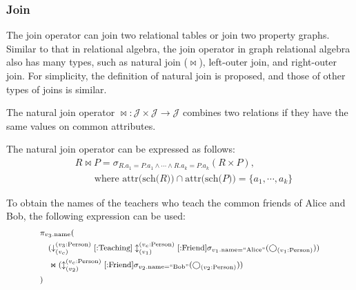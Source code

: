 \subsubsection{Join}

The join operator can join two relational tables or join two property graphs.
Similar to that in relational algebra, the join operator in graph relational algebra also has many types, such as natural join ($\Join$), left-outer join, and right-outer join.
For simplicity, the definition of natural join is proposed, and those of other types of joins is similar.

\begin{definition}
    The natural join operator $\Join : \mathcal{J} \times \mathcal{J} \rightarrow \mathcal{J}$ combines two relations if they have the same values on common attributes.
\end{definition}

The natural join operator can be expressed as follows:
\begin{equation*}
    \begin{split}
        & R \Join P = \sigma_{R.a_1 = P.a_1 \land \cdots \land R.a_k = P.a_k}(R \times P), \\
        & \hspace{2em} \text{where } \text{attr(sch($R$))} \cap \text{attr(sch($P$))} = \{a_1, \cdots, a_k\}
    \end{split}
\end{equation*}

\begin{example}
    To obtain the names of the teachers who teach the common friends of Alice and Bob, the following expression can be used:
    \begin{equation*}
        \footnotesize
        \begin{split}
            & \pi_{v_3\text{.name}}( \\
            & \hspace{1em} (\downarrow_{(v_c)}^{(v_3\text{:Person})}[\text{:Teaching}]\updownarrow_{(v_1)}^{(v_c\text{:Person})}[\text{:Friend}]\sigma_{v_1\text{.name=``Alice''}}(\bigcirc_{(v_1\text{:Person})})) \\
            & \hspace{1em} \Join (\updownarrow_{(v_2)}^{(v_c\text{:Person})}[\text{:Friend}]\sigma_{v_2\text{.name=``Bob''}}(\bigcirc_{(v_2\text{:Person})}))\\ 
            & )
        \end{split}
    \end{equation*}
\end{example}

